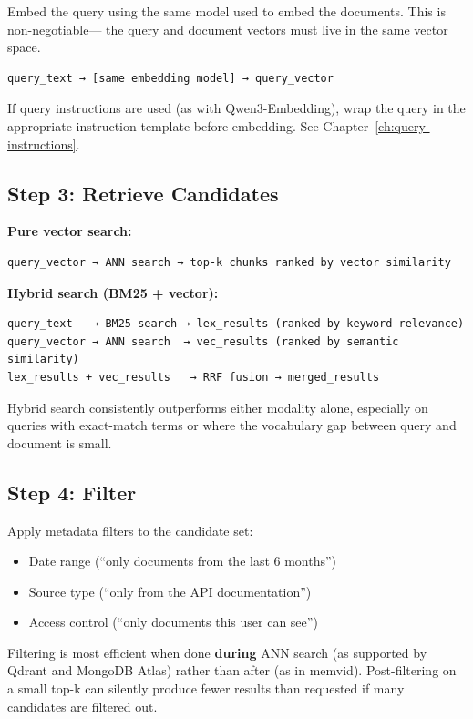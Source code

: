Embed the query using the same model used to embed the documents. This is non-negotiable---
the query and document vectors must live in the same vector space.

\begin{Verbatim}
query_text → [same embedding model] → query_vector
\end{Verbatim}

If query instructions are used (as with Qwen3-Embedding), wrap the query in the appropriate
instruction template before embedding. See Chapter~\ref{ch:query-instructions}.

\subsection{Step 3: Retrieve Candidates}

\textbf{Pure vector search:}

\begin{Verbatim}
query_vector → ANN search → top-k chunks ranked by vector similarity
\end{Verbatim}

\textbf{Hybrid search (BM25 + vector):}

\begin{Verbatim}
query_text   → BM25 search → lex_results (ranked by keyword relevance)
query_vector → ANN search  → vec_results (ranked by semantic similarity)
lex_results + vec_results   → RRF fusion → merged_results
\end{Verbatim}

Hybrid search consistently outperforms either modality alone, especially on queries with
exact-match terms or where the vocabulary gap between query and document is small.

\subsection{Step 4: Filter}

Apply metadata filters to the candidate set:

\begin{itemize}
    \item Date range (``only documents from the last 6 months'')
    \item Source type (``only from the API documentation'')
    \item Access control (``only documents this user can see'')
\end{itemize}

Filtering is most efficient when done \textbf{during} ANN search (as supported by Qdrant and
MongoDB Atlas) rather than after (as in memvid). Post-filtering on a small top-k can silently
produce fewer results than requested if many candidates are filtered out.

